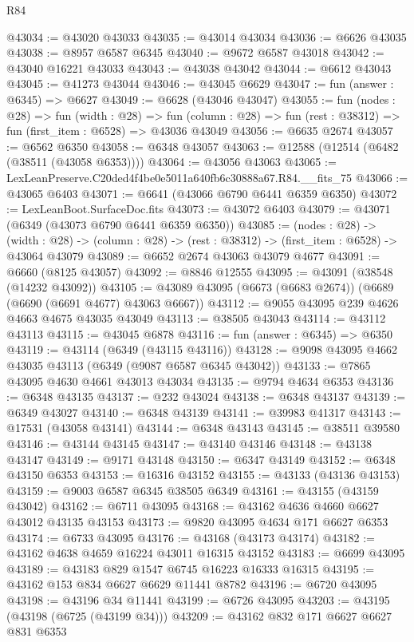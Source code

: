 \begin{lexlean}{R84}
\begin{coremodule}
@43034 := @43020 @43033
@43035 := @43014 @43034
@43036 := @6626 @43035
@43038 := @8957 @6587 @6345
@43040 := @9672 @6587 @43018
@43042 := @43040 @16221 @43033
@43043 := @43038 @43042
@43044 := @6612 @43043
@43045 := @41273 @43044
@43046 := @43045 @6629
@43047 := fun (answer : @6345) => @6627
@43049 := @6628 (@43046 @43047)
@43055 := fun (nodes : @28) =>
  fun (width : @28) =>
  fun (column : @28) => fun (rest : @38312) => fun (first_item : @6528) => @43036 @43049
@43056 := @6635 @2674
@43057 := @6562 @6350
@43058 := @6348 @43057
@43063 := @12588 (@12514 (@6482 (@38511 (@43058 @6353))))
@43064 := @43056 @43063
@43065 := LexLeanPreserve.C20ded4f4be0e5011a640fb6c30888a67.R84.__fits_75
@43066 := @43065 @6403
@43071 := @6641 (@43066 @6790 @6441 @6359 @6350)
@43072 := LexLeanBoot.SurfaceDoc.fits
@43073 := @43072 @6403
@43079 := @43071 (@6349 (@43073 @6790 @6441 @6359 @6350))
@43085 := (nodes : @28) ->
  (width : @28) -> (column : @28) -> (rest : @38312) -> (first_item : @6528) -> @43064 @43079
@43089 := @6652 @2674 @43063 @43079 @4677
@43091 := @6660 (@8125 @43057)
@43092 := @8846 @12555
@43095 := @43091 (@38548 (@14232 @43092))
@43105 := @43089 @43095 (@6673 (@6683 @2674)) (@6689 (@6690 (@6691 @4677) @43063 @6667))
@43112 := @9055 @43095 @239 @4626 @4663 @4675 @43035 @43049
@43113 := @38505 @43043
@43114 := @43112 @43113
@43115 := @43045 @6878
@43116 := fun (answer : @6345) => @6350
@43119 := @43114 (@6349 (@43115 @43116))
@43128 := @9098 @43095 @4662 @43035 @43113 (@6349 (@9087 @6587 @6345 @43042))
@43133 := @7865 @43095 @4630 @4661 @43013 @43034
@43135 := @9794 @4634 @6353
@43136 := @6348 @43135
@43137 := @232 @43024
@43138 := @6348 @43137
@43139 := @6349 @43027
@43140 := @6348 @43139
@43141 := @39983 @41317
@43143 := @17531 (@43058 @43141)
@43144 := @6348 @43143
@43145 := @38511 @39580
@43146 := @43144 @43145
@43147 := @43140 @43146
@43148 := @43138 @43147
@43149 := @9171 @43148
@43150 := @6347 @43149
@43152 := @6348 @43150 @6353
@43153 := @16316 @43152
@43155 := @43133 (@43136 @43153)
@43159 := @9003 @6587 @6345 @38505 @6349
@43161 := @43155 (@43159 @43042)
@43162 := @6711 @43095
@43168 := @43162 @4636 @4660 @6627 @43012 @43135 @43153
@43173 := @9820 @43095 @4634 @171 @6627 @6353
@43174 := @6733 @43095
@43176 := @43168 (@43173 @43174)
@43182 := @43162 @4638 @4659 @16224 @43011 @16315 @43152
@43183 := @6699 @43095
@43189 := @43183 @829 @1547 @6745 @16223 @16333 @16315
@43195 := @43162 @153 @834 @6627 @6629 @11441 @8782
@43196 := @6720 @43095
@43198 := @43196 @34 @11441
@43199 := @6726 @43095
@43203 := @43195 (@43198 (@6725 (@43199 @34)))
@43209 := @43162 @832 @171 @6627 @6627 @831 @6353

\end{coremodule}
\end{lexlean}
